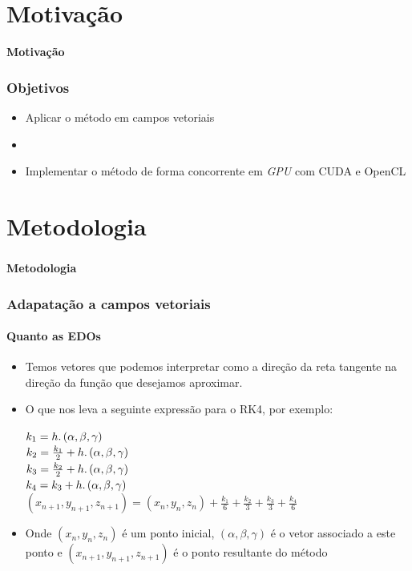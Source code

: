 \documentclass[brazil, 10pt]{beamer}
\begin{document}
\section{Motivação}
\begin{frame}
  \begin{Large}
  \begin{center}
  \textbf{Motivação}
  \end{center}
  \end{Large}
\end{frame}

\begin{frame}
  \frametitle{Objetivos}

  \begin{itemize}
    \item Aplicar o método em campos vetoriais
    \item 
    \item Implementar o método de forma concorrente em \textit{GPU} com CUDA e OpenCL
  \end{itemize}
\end{frame}

\section{Metodologia}
\begin{frame}
  \frametitle{}
  \framesubtitle{}
  \begin{Large}
  \begin{center}
  \textbf{Metodologia}
  \end{center}
  \end{Large}
\end{frame}

\begin{frame}
  \frametitle{Adapatação a campos vetoriais}
  \framesubtitle{Quanto as EDOs}
  
  \begin{itemize}
    \item Temos vetores que podemos interpretar como a direção da reta tangente na direção da função que desejamos aproximar.
    \item O que nos leva a seguinte expressão para o RK4, por exemplo:

    $k_{1} = h\ldotp (\alpha ,\beta ,\gamma)$\\
    $k_{2} = \frac{k_{1}}{2} + h\ldotp (\alpha ,\beta ,\gamma)$\\
    $k_{3} = \frac{k_{2}}{2} + h\ldotp (\alpha ,\beta ,\gamma)$\\
    $k_{4} = k_{3} + h\ldotp (\alpha ,\beta ,\gamma )$\\
    $(x_{n+1}, y_{n+1}, z_{n+1}) = (x_{n}, y_{n}, z_{n}) + \frac{k_{1}}{6} + \frac{k_{2}}{3} + \frac{k_{3}}{3} + \frac{k_{4}}{6}$
    
    \item Onde $ (x_{n}, y_{n}, z_{n}) $ é um ponto inicial, $(\alpha ,\beta ,\gamma)$ é o vetor associado a este ponto e $ (x_{n+1}, y_{n+1}, z_{n+1}) $ é o ponto resultante do método
  \end{itemize}


\end{frame}
\end{document}
